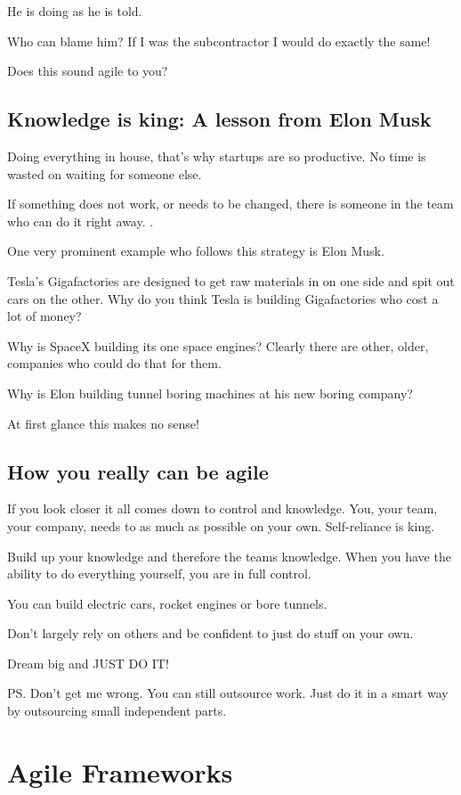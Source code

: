 \documentclass[12pt, numbers=noenddot]{scrreprt} %
\begin{document}
He is doing as he is told.

Who can blame him? If I was the subcontractor I would do exactly the same!

Does this sound agile to you?

\subsection{Knowledge is king: A lesson from Elon Musk}
Doing everything in house, that’s why startups are so productive. No time is wasted on waiting for someone else.

If something does not work, or needs to be changed, there is someone in the team who can do it right away.                        .

One very prominent example who follows this strategy is Elon Musk.

Tesla’s Gigafactories are designed to get raw materials in on one side and spit out cars on the other. Why do you think Tesla is building Gigafactories who cost a lot of money?

Why is SpaceX building its one space engines? Clearly there are other, older, companies who could do that for them.

Why is Elon building tunnel boring machines at his new boring company?

At first glance this makes no sense!

\subsection{How you really can be agile}
If you look closer it all comes down to control and knowledge. You, your team, your company, needs to as much as possible on your own. Self-reliance is king.

Build up your knowledge and therefore the teams knowledge. When you have the ability to do everything yourself, you are in full control.

You can build electric cars, rocket engines or bore tunnels.

Don’t largely rely on others and be confident to just do stuff on your own.

Dream big and JUST DO IT!

PS. Don’t get me wrong. You can still outsource work. Just do it in a smart way by outsourcing small independent parts.

\section{Agile Frameworks}
\end{document}
